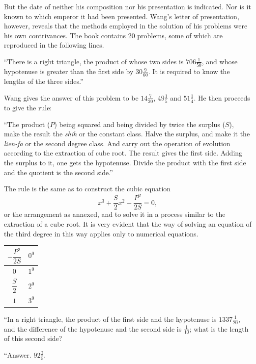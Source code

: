 \documentclass[11pt]{article}
\newcommand{\scanpage}[2]{\clearpage\setcounter{footnote}{0}\noindent{\footnotesize\color{gray}PDF page #1 · #2}\par\medskip}
\begin{document}
\scanpage{0068}{Chapter 8, printed page 54}
But the date of neither his composition nor his presentation is indicated. Nor is it known to which emperor it had been presented. Wang's letter of presentation, however, reveals that the methods employed in the solution of his problems were his own contrivances. The book contains 20 problems, some of which are reproduced in the following lines.

``There is a right triangle, the product of whose two sides is $706\frac{1}{50}$, and whose hypotenuse is greater than the first side by $30\frac{9}{60}$. It is required to know the lengths of the three sides.''

Wang gives the answer of this problem to be $14\frac{7}{20}$, $49\frac{1}{5}$ and $51\frac{1}{4}$. He then proceeds to give the rule:

``The product ($P$) being squared and being divided by twice the surplus ($S$), make the result the \emph{shih} or the constant class. Halve the surplus, and make it the \emph{lien-fa} or the second degree class. And carry out the operation of evolution according to the extraction of cube root. The result gives the first side. Adding the surplus to it, one gets the hypotenuse. Divide the product with the first side and the quotient is the second side.''

The rule is the same as to construct the cubic equation
\[
x^3+\frac{S}{2}x^2-\frac{P^2}{2S}=0,
\]
or the arrangement as annexed, and to solve it in a process similar to the extraction of a cube root. It is very evident that the way of solving an equation of the third degree in this way applies only to numerical equations.

\begin{center}
\renewcommand{\arraystretch}{1.45}
\begin{tabular}{|c|c|}\hline
$-\dfrac{P^2}{2S}$ & $0^0$\\\hline
$0$ & $1^0$\\\hline
$\dfrac{S}{2}$ & $2^0$\\\hline
$1$ & $3^0$\\\hline
\end{tabular}
\end{center}

``In a right triangle, the product of the first side and the hypotenuse is $1337\frac{1}{20}$, and the difference of the hypotenuse and the second side is $\frac{1}{10}$; what is the length of this second side?

``Answer. $92\frac{2}{5}$.
\end{document}
